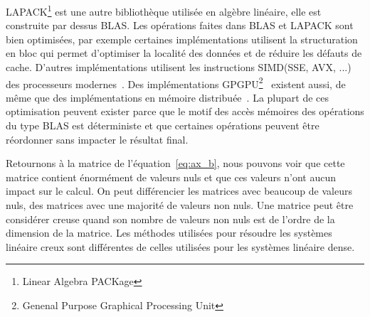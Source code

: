 LAPACK\footnote{Linear Algebra PACKage} est une autre bibliothèque utilisée en algèbre linéaire, elle est construite par dessus BLAS.
%
Les opérations faites dans BLAS et LAPACK sont bien optimisées, par exemple certaines implémentations utilisent la structuration en bloc qui permet d'optimiser la localité des données et de réduire les défauts de cache.
%
D'autres implémentations utilisent les instructions SIMD(SSE, AVX, ...) des processeurs modernes~\cite{intel_mkl}.
%
Des implémentations GPGPU\footnote{Genenal Purpose Graphical Processing Unit}~\cite{nvidia_cublas} existent aussi, de même que des implémentations en mémoire distribuée~\cite{dplasma}.
%
La plupart de ces optimisation peuvent exister parce que le motif des accès mémoires des opérations du type BLAS est déterministe et que certaines opérations peuvent être réordonner sans impacter le résultat final.


Retournons à la matrice de l'équation~\eqref{eq:ax_b}, nous pouvons voir que cette matrice contient énormément de valeurs nuls et que ces valeurs n'ont aucun impact sur le calcul.
%
On peut différencier les matrices avec beaucoup de valeurs nuls, des matrices avec une majorité de valeurs non nuls.
%
Une matrice peut être considérer creuse quand son nombre de valeurs non nuls est de l'ordre de la dimension de la matrice.
%
Les méthodes utilisées pour résoudre les systèmes linéaire creux sont différentes de celles utilisées pour les systèmes linéaire dense.
